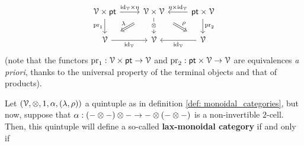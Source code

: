 \begin{definition}
\begin{enumerate}
                                $$
                                    \begin{tikzcd}
                                    	{\calV \x \pt} & {\calV \x \calV} & {\pt \x \calV} \\
                                    	\calV & \calV & \calV
                                    	\arrow["{\tensor}"{description}, from=1-2, to=2-2]
                                    	\arrow["{\eta \x \id_{\calV}}"', from=1-3, to=1-2]
                                    	\arrow["{\id_{\calV} \x \eta}", from=1-1, to=1-2]
                                    	\arrow["{\id_{\calV}}"', from=2-1, to=2-2]
                                    	\arrow["{\pr_1}"', from=1-1, to=2-1]
                                    	\arrow["{\pr_2}", from=1-3, to=2-3]
                                    	\arrow["{\id_{\calV}}", from=2-3, to=2-2]
                                    	\arrow["\lambda"', shorten <=13pt, shorten >=13pt, Rightarrow, from=1-2, to=2-1]
                                    	\arrow["\rho", shorten <=13pt, shorten >=13pt, Rightarrow, from=1-2, to=2-3]
                                    \end{tikzcd}
                                $$
                            (note that the functors $\pr_1: \calV \x \pt \to \calV$ and $\pr_2: \pt \x \calV \to \calV$ are equivalences \textit{a priori}, thanks to the universal property of the terminal objects and that of products).
                        \end{enumerate}
                    
                \end{definition}
                \begin{definition} \label{def: lax_monoidal_categories}
                    Let $(\calV, \tensor, 1, \alpha, (\lambda, \rho))$ a quintuple as in definition \ref{def: monoidal_categories}, but now, suppose that $\alpha: (- \tensor -) \tensor - \to - \tensor (- \tensor -)$ is a non-invertible $2$-cell. Then, this quintuple will define a so-called \textbf{lax-monoidal category} if and only if 
                \end{definition}
                \begin{definition}
                    
                \end{definition}
                
                \begin{definition} \label{def: braided_and_symmetric_monoidal_categories}
                    
                \end{definition}
                
